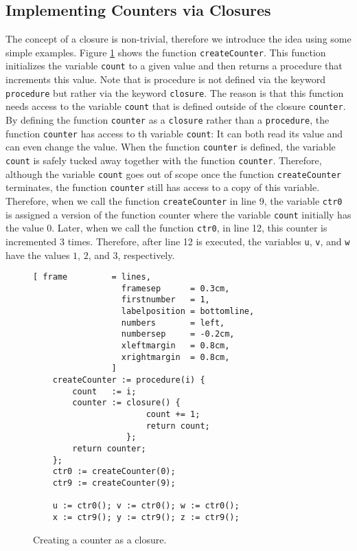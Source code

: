 \subsection{Implementing Counters via Closures}
The concept of a closure is non-trivial, therefore we introduce the idea using some simple
examples.  Figure \ref{fig:counter-closure.stlx} shows the function
\texttt{createCounter}.  This function initializes the variable \texttt{count} to a given
value and then returns a procedure that increments this value.  Note that is procedure is not
defined via the keyword \texttt{procedure} but rather via the keyword \texttt{closure}.  The reason
is that this function needs access to the variable \texttt{count} that is defined outside of the
closure \texttt{counter}.  By defining the function \texttt{counter} as a \texttt{closure} rather
than a \texttt{procedure},  the function \texttt{counter} has access to th variable \texttt{count}:
It can both read its value and can even change the value.  When the function \texttt{counter} is
defined, the variable \texttt{count} is safely tucked away together with the function
\texttt{counter}.  Therefore, although the variable \texttt{count} goes out of scope once the
function \texttt{createCounter} terminates, the function \texttt{counter} still has access
to a 
copy of this variable.  Therefore, when we call the function \texttt{createCounter} in line 9, 
the variable \texttt{ctr0} is assigned a version of the function counter where the variable
\texttt{count} initially has the value 0.  Later, when we call the function \texttt{ctr0},
in line 12, this counter is incremented 3 times.  Therefore, after line 12 is executed,
the variables \texttt{u}, \texttt{v}, and \texttt{w} have the values $1$, $2$, and $3$,
respectively. 


\begin{figure}[!ht]
\centering
\begin{Verbatim}[ frame         = lines, 
                  framesep      = 0.3cm, 
                  firstnumber   = 1,
                  labelposition = bottomline,
                  numbers       = left,
                  numbersep     = -0.2cm,
                  xleftmargin   = 0.8cm,
                  xrightmargin  = 0.8cm,
                ]
    createCounter := procedure(i) {
        count   := i;
        counter := closure() {
                       count += 1;
                       return count;
                   };
        return counter;
    };   
    ctr0 := createCounter(0);
    ctr9 := createCounter(9);
    
    u := ctr0(); v := ctr0(); w := ctr0();
    x := ctr9(); y := ctr9(); z := ctr9();
\end{Verbatim}
\vspace*{-0.3cm}
\caption{Creating a counter as a closure.}
\label{fig:counter-closure.stlx}
\end{figure}

